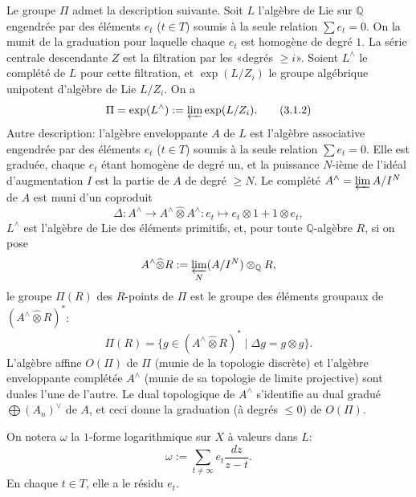 \documentclass[10pt]{article}
\newcommand{\Q}{\mathbb Q}
\begin{document}
Le groupe $\Pi$ admet la description suivante. Soit $L$ l'algèbre de Lie sur $\Q$ engendrée par des éléments $e_t$ ($t\in T$) soumis à la seule relation $\sum e_t=0$. On la munit de la graduation pour laquelle chaque $e_t$ est homogène de degré $1$. La série centrale descendante $Z$ est la filtration par les «degrés $\geq i$». Soient $L^\wedge$ le complété de $L$ pour cette filtration, et $\exp(L/Z_i)$ le groupe algébrique unipotent d'algèbre de Lie $L/Z_i$. On a
\begin{equation}
\Pi=\exp(L^\wedge):=\varprojlim\exp(L/Z_i).
\tag{3.1.2}
\end{equation}
Autre description: l'algèbre enveloppante $A$ de $L$ est l'algèbre associative engendrée par des éléments $e_t$ ($t\in T$) soumis à la seule relation $\sum e_t=0$. Elle est graduée, chaque $e_t$ étant homogène de degré un, et la puissance $N$-ième de l'idéal d'augmentation $I$ est la partie de $A$ de degré $\geq N$. Le complété $A^\wedge=\varprojlim A/I^N$ de $A$ est muni d'un coproduit
\[
\Delta:A^\wedge\to A^\wedge\widehat\otimes A^\wedge:
 e_t\longmapsto e_t\otimes1+1\otimes e_t,
\]
$L^\wedge$ est l'algèbre de Lie des éléments primitifs, et, pour toute $\Q$-algèbre $R$, si on pose
\[
A^\wedge\widehat\otimes R:=\varprojlim_N(A/I^N)\otimes_\Q R,
\]
le groupe $\Pi(R)$ des $R$-points de $\Pi$ est le groupe des éléments groupaux de $(A^\wedge\widehat\otimes R)^*$:
\begin{equation}
\Pi(R)=\{g\in(A^\wedge\widehat\otimes R)^*\mid \Delta g=g\otimes g\}.
\tag{3.1.3}
\end{equation}
L'algèbre affine $O(\Pi)$ de $\Pi$ (munie de la topologie discrète) et l'algèbre enveloppante complétée $A^\wedge$ (munie de sa topologie de limite projective) sont duales l'une de l'autre. Le dual topologique de $A^\wedge$ s'identifie au dual gradué $\bigoplus(A_n)^\vee$ de $A$, et ceci donne la graduation (à degrés $\leq0$) de $O(\Pi)$.

On notera $\omega$ la $1$-forme logarithmique sur $X$ à valeurs dans $L$:
\begin{equation}
 \omega:=\sum_{t\ne\infty}e_t\frac{dz}{z-t}.
\tag{3.1.4}
\end{equation}
En chaque $t\in T$, elle a le résidu $e_t$.
\end{document}
